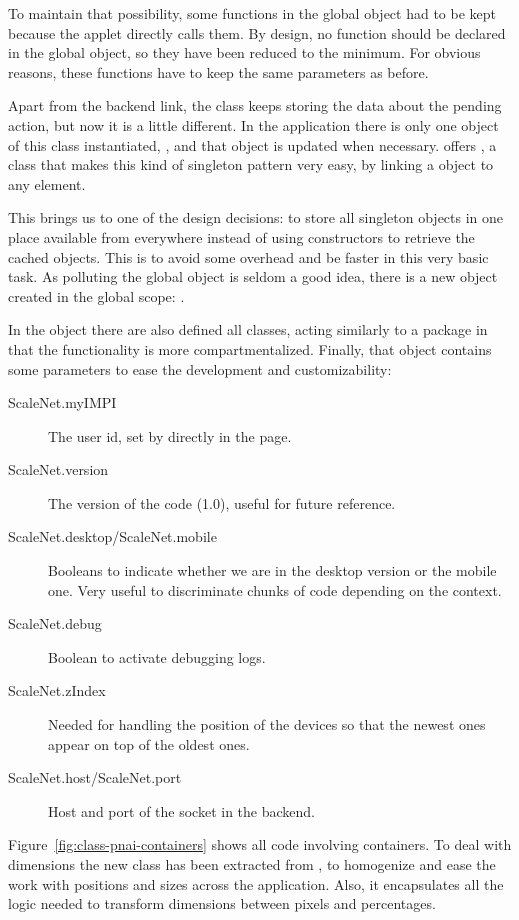 To maintain that possibility, some functions in the global object had to be kept because the applet directly calls them.
By design, no function should be declared in the global object, so they have been reduced to the minimum.
For obvious reasons, these functions have to keep the same parameters as before.

Apart from the backend link, the  class keeps storing the data about the pending action, but now it is a little different.
In the application there is only one object of this class instantiated, , and that object is updated when necessary.
 offers , a class that makes this kind of singleton pattern very easy, by linking a  object to any  element.

This brings us to one of the design decisions: to store all singleton objects in one place available from everywhere instead of using constructors to retrieve the cached objects.
This is to avoid some overhead and be faster in this very basic task.
As polluting the global object is seldom a good idea, there is a new object created in the global scope: .

In the  object there are also defined all  classes, acting similarly to a  package in that the functionality is more compartmentalized.
Finally, that object contains some parameters to ease the development and customizability:

\begin{description}
  \item[ScaleNet.myIMPI] The user id, set by  directly in the page.
  \item[ScaleNet.version] The version of the code (1.0), useful for future reference.
  \item[ScaleNet.desktop/ScaleNet.mobile] Booleans to indicate whether we are in the desktop version or the mobile one.
  Very useful to discriminate chunks of code depending on the context.
  \item[ScaleNet.debug] Boolean to activate debugging logs.
  \item[ScaleNet.zIndex] Needed for handling the position of the devices so that the newest ones appear on top of the oldest ones.
  \item[ScaleNet.host/ScaleNet.port] Host and port of the socket in the backend.
\end{description}

Figure~\vref{fig:class-pnai-containers} shows all code involving containers.
To deal with dimensions the new  class has been extracted from , to homogenize and ease the work with positions and sizes across the application.
Also, it encapsulates all the logic needed to transform dimensions between pixels and percentages.

